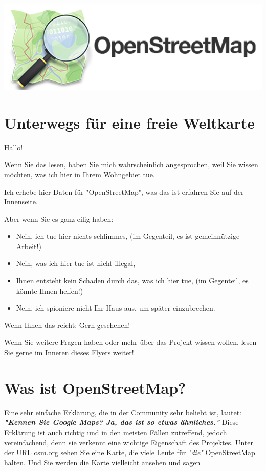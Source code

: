 \documentclass[10pt,foldmark,notumble]{leaflet}
\newcommand{\myhy}[1]{{\color{blue}\setulcolor{blue}\ul{#1}}}
\begin{document}
    \includegraphics[width=\linewidth]{logo.png}

    \section{Unterwegs für eine freie Weltkarte}
    Hallo!

    Wenn Sie das lesen, haben Sie mich wahrscheinlich angesprochen, weil Sie wissen möchten, was ich hier in Ihrem Wohngebiet tue.

    Ich erhebe hier Daten für "OpenStreetMap", was das ist erfahren Sie auf der Innenseite.

    Aber wenn Sie es ganz eilig haben:
    \begin{itemize}[noitemsep,topsep=0pt]
        \item Nein, ich tue hier nichts schlimmes, {\small(im Gegenteil, es ist gemeinnützige Arbeit!)}
        \item Nein, was ich hier tue ist nicht illegal,
        \item Ihnen entsteht kein Schaden durch das, was ich hier tue, {\small(im Gegenteil, es könnte Ihnen helfen!)}
        \item Nein, ich spioniere nicht Ihr Haus aus, um später einzubrechen.
    \end{itemize}

    Wenn Ihnen das reicht: Gern geschehen!

    Wenn Sie weitere Fragen haben oder mehr über das Projekt wissen wollen, lesen Sie gerne im Inneren dieses Flyers weiter!

    \section{Was ist OpenStreetMap?}
    Eine sehr einfache Erklärung, die in der Community sehr beliebt ist, lautet: \textit{\textbf{"Kennen Sie Google Maps? Ja, das ist so etwas ähnliches."}}
    Diese Erklärung ist auch richtig und in den meisten Fällen zutreffend, jedoch vereinfachend, denn sie verkennt eine wichtige Eigenschaft des Projektes.
    Unter der URL \myhy{osm.org} sehen Sie eine Karte, die viele Leute für \textit{"die"} OpenStreetMap halten.
    Und Sie werden die Karte vielleicht ansehen und sagen
\end{document}
